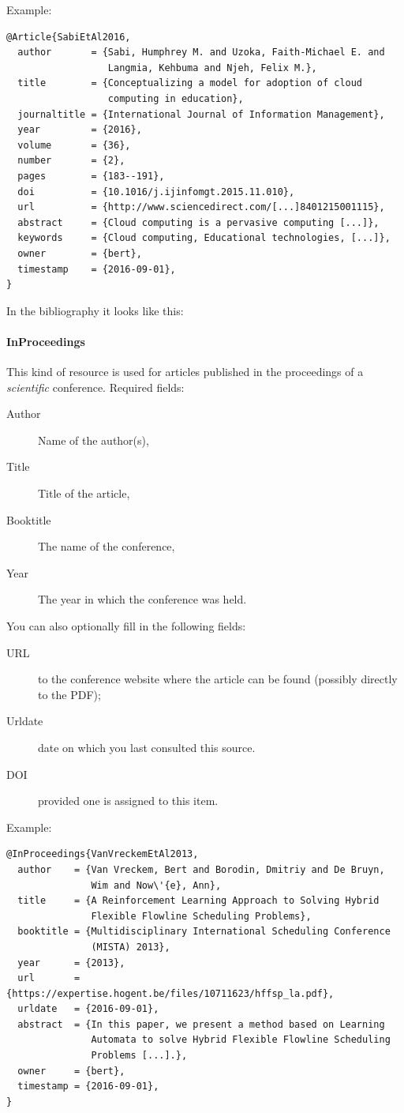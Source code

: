 Example:
\begin{verbatim}
@Article{SabiEtAl2016,
  author       = {Sabi, Humphrey M. and Uzoka, Faith-Michael E. and
                  Langmia, Kehbuma and Njeh, Felix M.},
  title        = {Conceptualizing a model for adoption of cloud
                  computing in education},
  journaltitle = {International Journal of Information Management},
  year         = {2016},
  volume       = {36},
  number       = {2},
  pages        = {183--191},
  doi          = {10.1016/j.ijinfomgt.2015.11.010},
  url          = {http://www.sciencedirect.com/[...]8401215001115},
  abstract     = {Cloud computing is a pervasive computing [...]},
  keywords     = {Cloud computing, Educational technologies, [...]},
  owner        = {bert},
  timestamp    = {2016-09-01},
}
\end{verbatim}

In the bibliography it looks like this: 

\paragraph{InProceedings}

This kind of resource is used for articles published in the proceedings of a \emph{scientific} conference. Required fields:

\begin{description}
 \item[Author] Name of the author(s),
 \item[Title] Title of the article,
 \item[Booktitle] The name of the conference,
 \item[Year] The year in which the conference was held.
\end{description}

You can also optionally fill in the following fields:

\begin{description}
 \item[URL] to the conference website where the article can be found (possibly directly to the PDF);
 \item[Urldate] date on which you last consulted this source.
 \item[DOI] provided one is assigned to this item.
\end{description}

Example:
\begin{verbatim}
@InProceedings{VanVreckemEtAl2013,
  author    = {Van Vreckem, Bert and Borodin, Dmitriy and De Bruyn,
               Wim and Now\'{e}, Ann},
  title     = {A Reinforcement Learning Approach to Solving Hybrid
               Flexible Flowline Scheduling Problems},
  booktitle = {Multidisciplinary International Scheduling Conference
               (MISTA) 2013},
  year      = {2013},
  url       = {https://expertise.hogent.be/files/10711623/hffsp_la.pdf},
  urldate   = {2016-09-01},
  abstract  = {In this paper, we present a method based on Learning
               Automata to solve Hybrid Flexible Flowline Scheduling 
               Problems [...].},
  owner     = {bert},
  timestamp = {2016-09-01},
}
\end{verbatim}

